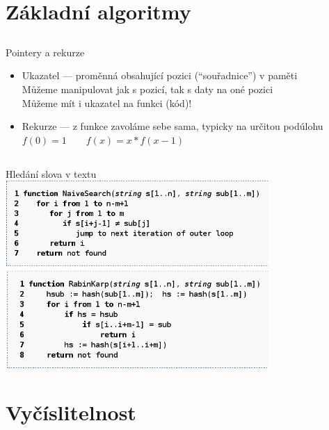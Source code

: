 \documentclass{beamer}
\begin{document}
\section{Základní algoritmy}

\subsection{}
\begin{frame}{Pointery a rekurze}
\begin{itemize}
\item Ukazatel --- proměnná obsahující pozici (``souřadnice'') v paměti \\
	Můžeme manipulovat jak s pozicí, tak s daty na oné pozici \\
	Můžeme mít i ukazatel na funkci (kód)!
\item Rekurze --- z funkce zavoláme sebe sama, typicky na určitou podúlohu \\
	$f(0) = 1 \qquad f(x) = x * f(x - 1)$
\end{itemize}
\end{frame}

\subsection{}
\begin{frame}{Hledání slova v textu}
\includegraphics[width=10cm]{naive.png} \\
\includegraphics[width=10cm]{rabinkarp.png}
\end{frame}

\section{Vyčíslitelnost}
\end{document}
